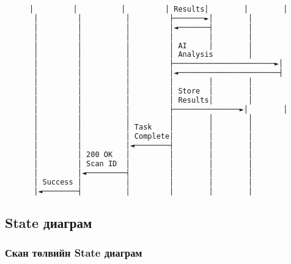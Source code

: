 \documentclass[main.tex]{subfiles}
\begin{document}
\begin{figure}[h]
\begin{lstlisting}[language=bash, caption=Start Scan Sequence диаграм]
 │         │          │         │ Results│        │        │
 │         │          │         ├───────►│        │        │
 │         │          │         │◄───────┤        │        │
 │         │          │         │        │        │        │
 │         │          │         │ AI     │        │        │
 │         │          │         │ Analysis        │        │
 │         │          │         ├───────────────────────►│
 │         │          │         │◄───────────────────────┤
 │         │          │         │        │        │        │
 │         │          │         │ Store  │        │        │
 │         │          │         │ Results│        │        │
 │         │          │         ├───────────────►│        │
 │         │          │         │        │        │        │
 │         │          │ Task    │        │        │        │
 │         │          │ Complete│        │        │        │
 │         │          │◄────────┤        │        │        │
 │         │ 200 OK   │         │        │        │        │
 │         │ Scan ID  │         │        │        │        │
 │         │◄─────────┤         │        │        │        │
 │ Success │          │         │        │        │        │
 │◄────────┤          │         │        │        │        │
\end{lstlisting}
\end{figure}

\subsection{State диаграм}

\subsubsection{Скан төлвийн State диаграм}
\end{document}
